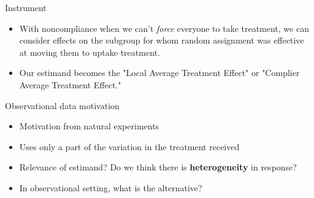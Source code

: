 \documentclass[xcolor={dvipsnames},handout]{beamer}
\begin{document}

\begin{frame}{Instrument}

\begin{itemize}
\item With noncompliance when we can't \textit{force} everyone to take treatment, we can consider effects on the subgroup for whom random assignment was effective at moving them to uptake treatment.
\item Our estimand becomes the "Local Average Treatment Effect" or "Complier Average Treatment Effect."
\end{itemize}

\end{frame}



\begin{frame}{Observational data motivation}

\begin{itemize}
\item Motivation from natural experiments \citep{angrist2001instrumental}
\item Uses only a part of the variation in the treatment received
\item Relevance of estimand?  Do we think there is \textbf{heterogeneity} in response?
\item In observational setting, what is the alternative?
\end{itemize}

\end{frame}


\end{document}
